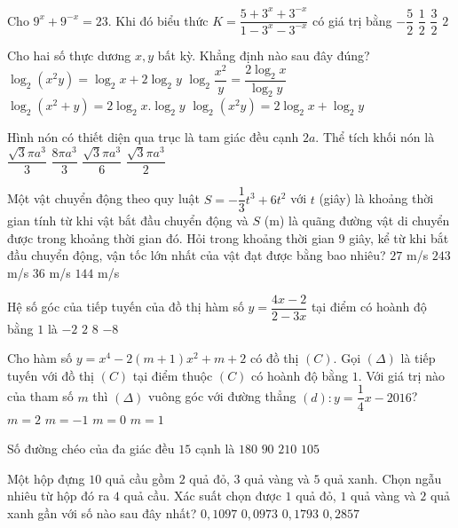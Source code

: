 \begin{ex}%
Cho $9^x+9^{-x}=23$. Khi đó biểu thức $K=\dfrac{5+3^x+3^{-x}}{1-3^{x}-3^{-x}}$ có giá trị bằng
\choice
{\True $-\dfrac{5}{2}$}
{$\dfrac{1}{2}$}
{$\dfrac{3}{2}$}
{$2$}
\end{ex}
\begin{ex}%
Cho hai số thực dương $x,y$ bất kỳ. Khẳng định nào sau đây đúng?
\choice
{$\log_2\left(x^2y\right)=\log_2x+2\log_2y$}
{$\log_2\dfrac{x^2}{y}=\dfrac{2\log_2x}{\log_2y}$}
{$\log_2\left(x^2+y\right)=2\log_2x.\log_2y$}
{\True $\log_2\left(x^2y\right)=2\log_2x+\log_2y$}
\end{ex}
\begin{ex}%
Hình nón có thiết diện qua trục là tam giác đều cạnh $2a$. Thể tích khối nón là
\choice
{\True $\dfrac{\sqrt{3}\pi a^3}{3}$}
{$\dfrac{8\pi a^3}{3}$}
{$\dfrac{\sqrt{3}\pi a^3}{6}$}
{$\dfrac{\sqrt{3}\pi a^3}{2}$}
\end{ex}
\begin{ex}%
Một vật chuyển động theo quy luật $S=-\dfrac{1}{3}t^3+6t^2$ với $t$ (giây) là khoảng thời gian tính từ khi vật bắt đầu chuyển động và $S$ (m) là quãng đường vật di chuyển được trong khoảng thời gian đó. Hỏi trong khoảng thời gian $9$ giây, kể từ khi bắt đầu chuyển động, vận tốc lớn nhất của vật đạt được bằng bao nhiêu?
\choice
{$27$ m/s}
{$243$ m/s}
{\True $36$ m/s}
{$144$ m/s}
\end{ex}
\begin{ex}%
Hệ số góc của tiếp tuyến của đồ thị hàm số $y=\dfrac{4x-2}{2-3x}$ tại điểm có hoành độ bằng $1$ là
\choice
{$-2$}
{\True $2$}
{$8$}
{$-8$}
\end{ex}
\begin{ex}%
Cho hàm số $y=x^4-2(m+1)x^2+m+2$ có đồ thị $(C)$. Gọi $(\Delta)$ là tiếp tuyến với đồ thị $(C)$ tại điểm thuộc $(C)$ có hoành độ bằng $1$. Với giá trị nào của tham số $m$ thì $(\Delta)$ vuông góc với đường thẳng $(d): y=\dfrac{1}{4}x-2016$?
\choice
{$m=2$}
{$m=-1$}
{$m=0$}
{\True $m=1$}
\end{ex}
\begin{ex}%
Số đường chéo của đa giác đều $15$ cạnh là
\choice
{$180$}
{\True $90$}
{$210$}
{$105$}
\end{ex}
\begin{ex}%
Một hộp đựng $10$ quả cầu gồm $2$ quả đỏ, $3$ quả vàng và $5$ quả xanh. Chọn ngẫu nhiêu từ hộp đó ra $4$ quả cầu. Xác suất chọn được $1$ quả đỏ, $1$ quả vàng và $2$ quả xanh gần với số nào sau đây nhất?
\choice
{$0,1097$}
{$0,0973$}
{$0,1793$}
{\True $0,2857$}
\end{ex}
